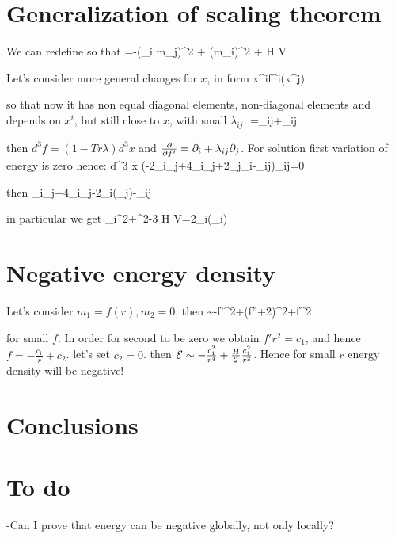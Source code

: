 \documentclass[12pt,a4paper]{article}
\begin{document}
\section{Generalization of scaling theorem}
We can redefine so that 
\be\label{energyre}
\CE=-(\pa_i m_j)^2 + (\Delta m_i)^2 + H V
\ee 

Let's consider more general changes for $x$, in form
\be
x^i\rightarrow f^i(x^j)
\ee

so that now it has non equal diagonal elements, non-diagonal elements and depends on $x^i$, but still close to $x$, with small $\lambda_{ij}$:
\be
{}=\delta_{ij}+\lambda_{ij}
\ee

then $d^3 f=(1-Tr\lambda)d^3 x$ and $\frac{\partial}{\partial f^i}=\partial_i+\lambda_{ij}\partial_j$. For solution first variation of energy is zero hence:
\be
\int d^3 x (-2\pa_i\pa_j+4\pa_i\pa_j\Delta{}+2\pa_j\Delta{}\pa_i-\delta_{ij}\CE)\lambda_{ij}=0
\ee

then
\pa_i\pa_j+4\pa_i\pa_j\Delta{}-2\pa_i(\pa_j\Delta{})-\delta_{ij}
\ee

in particular we get
\be
\pa_i^2+\Delta{}^2-3 H V=2\pa_i(\pa_i\Delta{})
\ee

\section{Negative energy density}
Let's consider $m_1=f(r), m_2=0$, then
\be
\CE\sim-f'^2+(f''+2)^2+f^2
\ee

for small $f$. In order for second to be zero we obtain $f'r^2=c_1$, and hence $f=-\frac{c_1}{r}+c_2$. let's set $c_2=0$. then $\mathcal{E}\sim-\frac{c_1^2}{r^4}+\frac{H}{2}\frac{c_1^2}{r^2}$. Hence for small $r$ energy density will be negative!

\section{Conclusions}


\section{To do}
-Can I prove that energy can be negative globally, not only locally?
\end{document}
